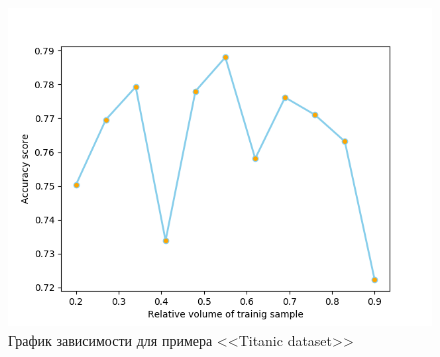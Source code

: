 \documentclass[]{article}
\numberwithin{equation}{section}
\begin{document}
    \begin{figure}[H]
        \centering
        \includegraphics[width = 0.9\linewidth]{data/titanic.png}
        \caption{График зависимости для примера <<Titanic dataset>>}
    \end{figure}
\end{document}
